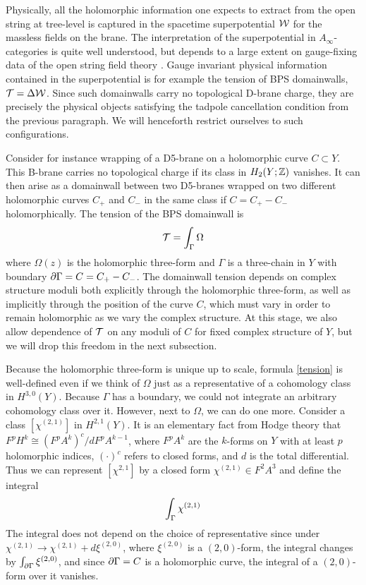 Physically, all the holomorphic information one expects to extract 
from the open string at tree-level is captured in the spacetime 
superpotential ${\cal W}$ for the massless fields on the brane. The
interpretation of the superpotential in $A_\infty$-categories is 
quite well understood, but depends to a large extent on gauge-fixing
data of the open string field theory \cite{wittencs,calin}. 
Gauge invariant physical information contained in the superpotential
is for example the tension of BPS domainwalls, ${\cal T}=\Delta{\cal W}$.
Since such domainwalls carry no topological D-brane charge, they
are precisely the physical objects satisfying the tadpole
cancellation condition from the previous paragraph. We will henceforth
restrict ourselves to such configurations.

Consider for instance wrapping of a D5-brane on a holomorphic curve 
$C\subset Y$. This B-brane carries no topological charge if its class 
in $H_2(Y;{\mathbb Z})$ vanishes. It can then arise as a domainwall between 
two D5-branes wrapped on two different holomorphic curves $C_+$ and 
$C_-$ in the same class if $C=C_+-C_-$ holomorphically. The tension
of the BPS domainwall is \cite{wittenqcd}
\begin{equation}
\eqlabel{tension}
\calt = \int_{\Gamma} \Omega
\end{equation}
where $\Omega(z)$ is the holomorphic three-form and $\Gamma$ is a three-chain
in $Y$ with boundary $\partial\Gamma=C=C_+-C_-$. The domainwall tension
depends on complex structure moduli both explicitly through the holomorphic 
three-form, as well as implicitly through the position of the curve $C$,
which must vary in order to remain holomorphic as we vary the complex 
structure. At this stage, we also allow dependence of ${\cal T}$ on any
moduli of $C$ for fixed complex structure of $Y$, but we will drop this 
freedom in the next subsection.

Because the holomorphic three-form is unique up to scale, formula \eqref{tension} 
is well-defined even if we think of $\Omega$ just as a representative of 
a cohomology class in $H^{3,0}(Y)$. Because $\Gamma$ has a boundary, we could 
not integrate an arbitrary cohomology class over it. However, next
to $\Omega$, we can do one more. Consider a class $[\chi^{(2,1)}]$ in
$H^{2,1}(Y)$. It is an elementary fact from Hodge theory that
$F^pH^k\cong(F^pA^k)^c/dF^pA^{k-1}$, where $F^pA^k$ are the $k$-forms on
$Y$ with at least $p$ holomorphic indices, $(\cdot)^c$ refers to closed
forms, and $d$ is the total differential. Thus we can represent $[\chi^{2,1}]$ 
by a closed form $\chi^{(2,1)}\in F^2 A^3$ and define the integral
\begin{equation}
\eqlabel{integral}
\int_{\Gamma} \chi^{(2,1)}
\end{equation}
The integral does not depend on the choice of representative since under 
$\chi^{(2,1)}\to\chi^{(2,1)}+ d\xi^{(2,0)}$, where $\xi^{(2,0)}$ is a 
$(2,0)$-form, the integral changes by $\int_{\partial\Gamma} \xi^{(2,0)}$, 
and since $\partial\Gamma=C$ is a holomorphic curve, the integral of a 
$(2,0)$-form over it vanishes.

